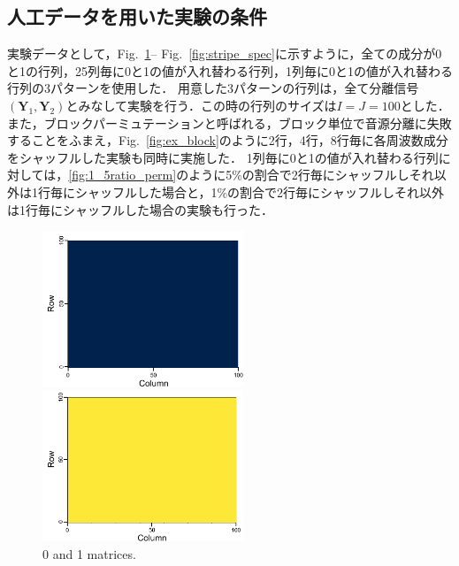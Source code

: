 \subsection{人工データを用いた実験の条件}
\label{sec:ex_condition_matrix}
実験データとして，Fig.~\ref{fig:01mat_spec}-- Fig.~\ref{fig:stripe_spec}に示すように，全ての成分が0と1の行列，25列毎に0と1の値が入れ替わる行列，1列毎に0と1の値が入れ替わる行列の3パターンを使用した．
用意した3パターンの行列は，全て分離信号$(\bm{Y}_1, \bm{Y}_2)$とみなして実験を行う．この時の行列のサイズは$I=J=100$とした．
また，ブロックパーミュテーションと呼ばれる，ブロック単位で音源分離に失敗することをふまえ，Fig.~\ref{fig:ex_block}のように2行，4行，8行毎に各周波数成分をシャッフルした実験も同時に実施した．
1列毎に0と1の値が入れ替わる行列に対しては，\ref{fig:1_5ratio_perm}のように5\%の割合で2行毎にシャッフルしそれ以外は1行毎にシャッフルした場合と，1\%の割合で2行毎にシャッフルしそれ以外は1行毎にシャッフルした場合の実験も行った．

\begin{figure}[htbp]
    \begin{minipage}[b]{0.45\linewidth}
      \centering
      \includegraphics[keepaspectratio, width=6.0cm]{figures/origi_spec/0mat.pdf}
    \end{minipage}
    \begin{minipage}[b]{0.45\linewidth}
      \centering
      \includegraphics[keepaspectratio, width=6.0cm]{figures/origi_spec/1mat.pdf}
    \end{minipage}
    \caption{0 and 1 matrices.}
    \label{fig:01mat_spec}
\end{figure}

